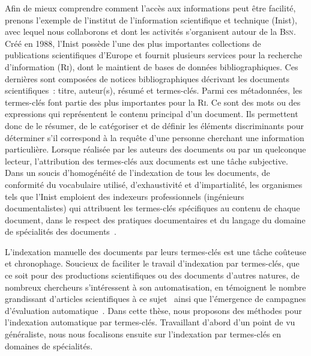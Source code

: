     Afin de mieux comprendre comment l'accès aux informations peut être
    facilité, prenons l'exemple de l'institut de l'information scientifique et
    technique (Inist), avec lequel nous collaborons et dont les activités
    s'organisent autour de la \textsc{Bsn}. Créé en 1988, l'Inist possède l'une
    des plus importantes collections de publications scientifiques d'Europe et
    fournit plusieurs services pour la recherche d'information (\textsc{Ri}),
    dont le maintient de bases de données bibliographiques. Ces dernières sont
    composées de notices bibliographiques décrivant les documents
    scientifiques~: titre, auteur(s), résumé et termes-clés. Parmi ces
    métadonnées, les termes-clés font partie des plus importantes pour la
    \textsc{Ri}. Ce sont des mots ou des expressions qui représentent le contenu
    principal d'un document. Ils permettent donc de le résumer, de le
    catégoriser et de définir les éléments discriminants pour déterminer s'il
    correspond à la requête d'une personne cherchant une information
    particulière. Lorsque réalisée par les auteurs des documents ou par un
    quelconque lecteur, l'attribution des termes-clés aux documents est une
    tâche subjective. Dans un soucis d'homogénéité de l'indexation de tous les
    documents, de conformité du vocabulaire utilisé, d'exhaustivité et
    d'impartialité, les organismes tels que l'Inist emploient des indexeurs
    professionnels (ingénieurs documentalistes) qui attribuent les termes-clés
    spécifiques au contenu de chaque document, dans le respect des pratiques
    documentaires et du langage du domaine de spécialités des
    documents~\cite{guinchat1996techniquesdocumentaires}.

    L'indexation manuelle des documents par leurs termes-clés est une tâche
    coûteuse et chronophage. Soucieux de faciliter le travail d'indexation par
    termes-clés, que ce soit pour des productions scientifiques ou des documents
    d'autres natures, de nombreux chercheurs s'intéressent à son automatisation,
    en témoignent le nombre grandissant d'articles scientifiques à ce
    sujet~\cite{hasan2014state_of_the_art} ainsi que l'émergence de campagnes
    d'évaluation automatique~\cite{kim2010semeval,paroubek2012deft}. Dans cette
    thèse, nous proposons des méthodes pour l'indexation automatique par
    termes-clés. Travaillant d'abord d'un point de vu généraliste, nous nous
    focalisons ensuite sur l'indexation par termes-clés en domaines de
    spécialités.


